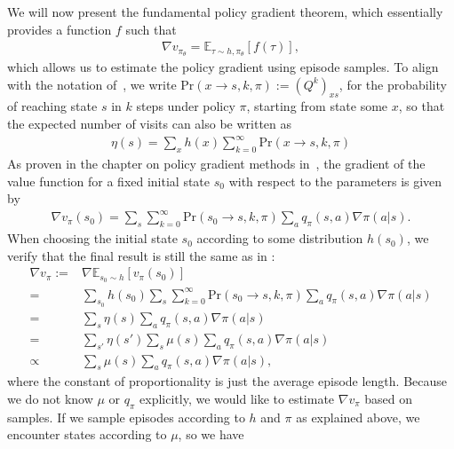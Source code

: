\documentclass[a4paper]{report}
\theoremstyle{definition}
\theoremstyle{plain}
\begin{document}
We will now present the fundamental policy gradient theorem, which essentially
provides a function $f$ such that
\begin{align*}
  \nabla v_{\pi_{\theta}} = \mathbb{E}_{\tau \sim h,\pi_{\theta}}[f(\tau)] ,
\end{align*}
which allows us to estimate the policy gradient using episode samples.
%
To align with the notation
of~\cite{suttonReinforcementLearningIntroduction2018}, we write
$\mathrm{Pr}(x \rightarrow s, k, \pi) := (Q^{k})_{xs}$, for the probability of
reaching state $s$ in $k$ steps under policy $\pi$, starting from state some
$x$, so that the expected number of visits can also be written as
\begin{align*}
  \eta(s) = \sum_{x} h(x) \sum_{k=0}^{\infty} \mathrm{Pr}(x \rightarrow s, k, \pi)
\end{align*}
%
As proven in the chapter on policy gradient methods
in~\cite{suttonReinforcementLearningIntroduction2018}, the gradient of the value
function for a fixed initial state $s_0$ with respect to the parameters is given
by
\begin{align}
  \nabla v_{\pi}(s_{0}) = \sum_{s} \sum_{k=0}^{\infty} \mathrm{Pr}(s_{0} \rightarrow s, k, \pi) \sum_{a} q_{\pi}(s,a) \nabla \pi(a|s) .
\end{align}
When choosing the initial state $s_{0}$ according to some distribution
$h(s_{0})$, we verify that the final result is still the same as in
\cite{suttonReinforcementLearningIntroduction2018}:
\begin{subequations}
\begin{align}
  \nabla v_{\pi} :=& \nabla \mathbb{E}_{s_{0} \sim h}[v_{\pi}(s_{0})] \\
  =& \sum_{s_{0}} h(s_{0}) \sum_{s} \sum_{k=0}^{\infty} \mathrm{Pr}(s_{0} \rightarrow s, k, \pi) \sum_{a} q_{\pi}(s,a) \nabla \pi(a|s) \\
  =& \sum_{s} \eta(s) \sum_{a} q_{\pi}(s,a) \nabla \pi(a|s) \\
  =& \sum_{s'} \eta(s') \sum_{s} \mu(s) \sum_{a} q_{\pi}(s,a) \nabla \pi(a|s) \\
  \propto& \sum_{s} \mu(s) \sum_{a} q_{\pi}(s,a) \nabla \pi(a|s) ,
\end{align}
\end{subequations}
where the constant of proportionality is just the average episode length.
%
Because we do not know $\mu$ or $q_{\pi}$ explicitly, we would like to estimate
$\nabla v_{\pi}$ based on samples. If we sample episodes according to $h$ and
$\pi$ as explained above, we encounter states according to $\mu$, so we have
\end{document}
